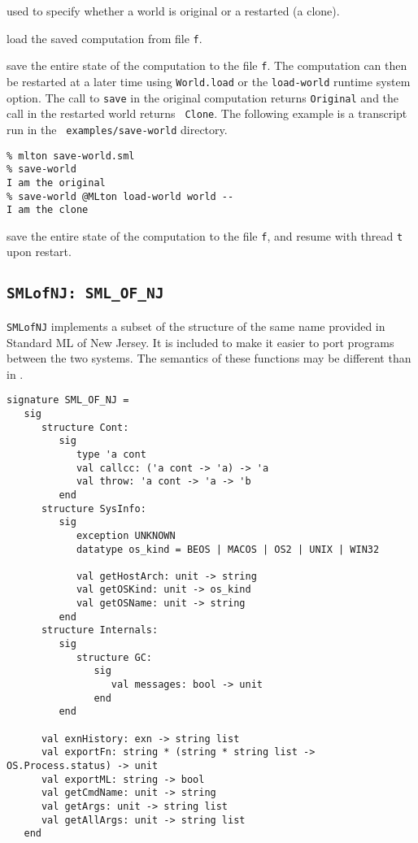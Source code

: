 \begin{description}
used to specify whether a world is original or a restarted (a clone).

load the saved computation from file {\tt f}.

save the entire state of the computation to
the file {\tt f}.  The computation can then be restarted at a later
time using {\tt World.load} or the {\tt load-world} runtime system
option.  The call to {\tt save} in the original computation returns
{\tt Original} and the call in the restarted world returns {\tt
Clone}.  The following example is a transcript run in the {\tt
examples/save-world} directory.
\begin{verbatim}
% mlton save-world.sml
% save-world
I am the original
% save-world @MLton load-world world --
I am the clone
\end{verbatim}

save the entire state of the computation to
the file {\tt f}, and resume with thread {\tt t} upon restart.

\end{description}

\subsection{{\tt SMLofNJ: SML\_OF\_NJ}}

{\tt SMLofNJ} implements a subset of the structure of the same name
provided in Standard ML of New Jersey.  It is included to make it
easier to port programs between the two systems.  The semantics of
these functions may be different than in {\smlnj}.

\begin{verbatim}
signature SML_OF_NJ =
   sig
      structure Cont:
         sig
            type 'a cont
            val callcc: ('a cont -> 'a) -> 'a
            val throw: 'a cont -> 'a -> 'b
         end
      structure SysInfo:
         sig
            exception UNKNOWN
            datatype os_kind = BEOS | MACOS | OS2 | UNIX | WIN32

            val getHostArch: unit -> string
            val getOSKind: unit -> os_kind
            val getOSName: unit -> string
         end
      structure Internals:
         sig
            structure GC:
               sig
                  val messages: bool -> unit
               end             
         end

      val exnHistory: exn -> string list
      val exportFn: string * (string * string list -> OS.Process.status) -> unit
      val exportML: string -> bool
      val getCmdName: unit -> string
      val getArgs: unit -> string list
      val getAllArgs: unit -> string list
   end
\end{verbatim}

